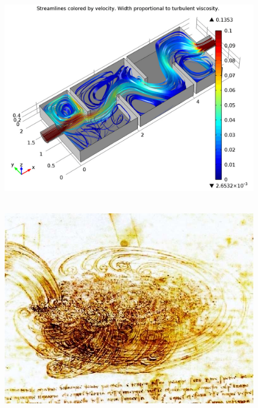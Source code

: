 \documentclass[11pt]{article}
\begin{document}
\begin{multicols}{2}

  \begin{figure}[H]
        \centering
        \includegraphics[width=0.8\linewidth]{3x11-equations/ns-2.png}
  \end{figure}
    \begin{figure}[H]
        \centering
        \includegraphics[width=0.8\linewidth]{3x11-equations/ns-3.png}
  \end{figure}

\end{multicols}
\end{document}
